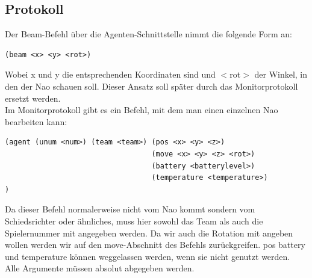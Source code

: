 \subsection{Protokoll}
Der Beam-Befehl über die Agenten-Schnittstelle nimmt die folgende Form an:

\begin{verbatim}(beam <x> <y> <rot>)
\end{verbatim}
Wobei x und y die entsprechenden Koordinaten sind und $<$rot$>$ der
 Winkel, in den der Nao schauen soll. Dieser Ansatz soll später durch das Monitorprotokoll ersetzt 
werden.\\
Im Monitorprotokoll gibt es ein Befehl, mit dem man einen einzelnen Nao bearbeiten kann:

\begin{verbatim}(agent (unum <num>) (team <team>) (pos <x> <y> <z>)
                                  (move <x> <y> <z> <rot>)
                                  (battery <batterylevel>)
                                  (temperature <temperature>)
)
\end{verbatim}
Da dieser Befehl normalerweise nicht vom Nao kommt sondern vom 
Schiedsrichter oder ähnliches, muss hier sowohl das Team als auch die 
Spielernummer mit angegeben werden. Da wir auch die Rotation mit angeben
 wollen werden wir auf den move-Abschnitt des Befehls zurückgreifen. pos
 battery und temperature können weggelassen werden, wenn sie nicht 
genutzt werden.\\
Alle Argumente müssen absolut abgegeben werden.
